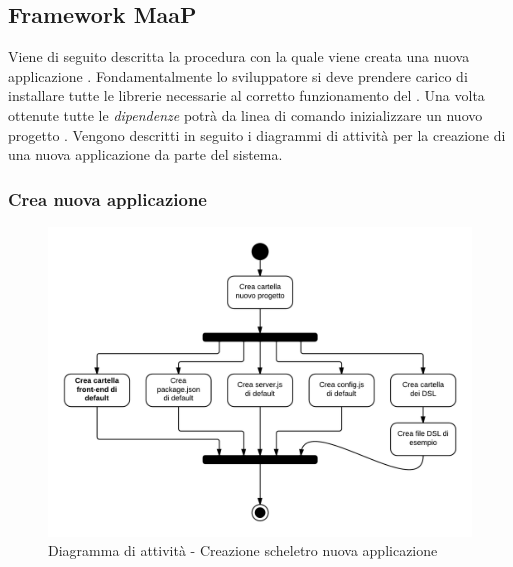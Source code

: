 %
%
%
%

\subsection{Framework MaaP}

Viene di seguito descritta la procedura con la quale viene creata una nuova applicazione . Fondamentalmente lo sviluppatore si deve prendere carico di installare tutte le librerie necessarie al corretto funzionamento del . Una volta ottenute tutte le \textit{dipendenze} potrà da linea di comando inizializzare un nuovo progetto . Vengono descritti in seguito i diagrammi di attività per la creazione di una nuova applicazione da parte del sistema.

\subsubsection{Crea nuova applicazione}

\begin{figure}[H]
\centering
\includegraphics[scale=0.2]{uml/Framework - Diagramma di installazione.png}
\caption{Diagramma di attività - Creazione scheletro nuova applicazione}
\end{figure}

